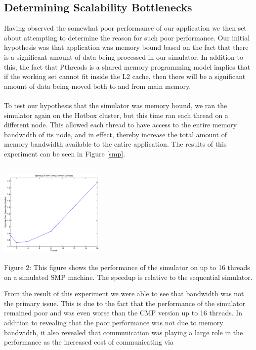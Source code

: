 \documentclass{article}
\begin{document}
\begin{multicols}{2}
\subsection{Determining Scalability Bottlenecks}
Having observed the somewhat poor performance of our application we then
set about attempting to determine the reason for such poor performance.
Our initial hypothesis was that application was memory bound based on the
fact that there is a significant amount of data being processed in our
simulator.  In addition to this, the fact that Pthreads is a shared memory
programming model implies that if the working set cannot fit inside the L2
cache, then there will be a significant amount of data being moved both to
and from main memory.\\
~\\
To test our hypothesis that the simulator was memory bound, we ran the
simulator again on the Hotbox cluster, but this time ran each thread on a
different node.  This allowed each thread to have access to the entire
memory bandwidth of its node, and in effect, thereby increase the total
amount of memory bandwidth available to the entire application.  The
results of this experiment can be seen in Figure \ref{smp}.\\
\begin{center}
\includegraphics[height=2in,width=2in]{smp.eps} \\
\small{Figure 2: This figure shows the performance of the simulator on
up to 16 threads on a simulated SMP machine.  The speedup is relative to
the sequential simulator.}
\end{center}
From the result of this experiment we were able to see that bandwidth was
not the primary issue.  This is due to the fact that the performance of
the simulator remained poor and was even worse than the CMP version up to
16 threads.  In addition to revealing that the poor performance was not
due to memory bandwidth, it also revealed that communication was playing a
large role in the performance as the increased cost of communicating via

\end{multicols}
\end{document}
